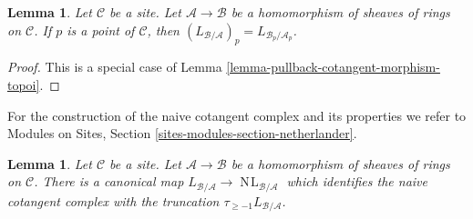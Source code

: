 \documentclass{stacks-project}
\theoremstyle{plain}
\newtheorem{lemma}[subsection]{Lemma}
\theoremstyle{definition}
\theoremstyle{remark}
\numberwithin{equation}{subsection}
\def\NL{\mathop{N\!L}\nolimits}
\begin{document}
\begin{lemma}
\label{lemma-stalk-cotangent-complex}
Let $\mathcal{C}$ be a site. Let $\mathcal{A} \to \mathcal{B}$ be a
homomorphism of sheaves of rings on $\mathcal{C}$. If $p$ is a point
of $\mathcal{C}$, then
$(L_{\mathcal{B}/\mathcal{A}})_p = L_{\mathcal{B}_p/\mathcal{A}_p}$.
\end{lemma}

\begin{proof}
This is a special case of Lemma \ref{lemma-pullback-cotangent-morphism-topoi}.
\end{proof}

\noindent
For the construction of the naive cotangent complex and its properties
we refer to
Modules on Sites, Section \ref{sites-modules-section-netherlander}.

\begin{lemma}
\label{lemma-compare-cotangent-complex-with-naive}
Let $\mathcal{C}$ be a site. Let $\mathcal{A} \to \mathcal{B}$ be a
homomorphism of sheaves of rings on $\mathcal{C}$.
There is a canonical map
$L_{\mathcal{B}/\mathcal{A}} \to \NL_{\mathcal{B}/\mathcal{A}}$
which identifies the naive cotangent complex with the truncation
$\tau_{\geq -1}L_{\mathcal{B}/\mathcal{A}}$.
\end{lemma}
\end{document}
